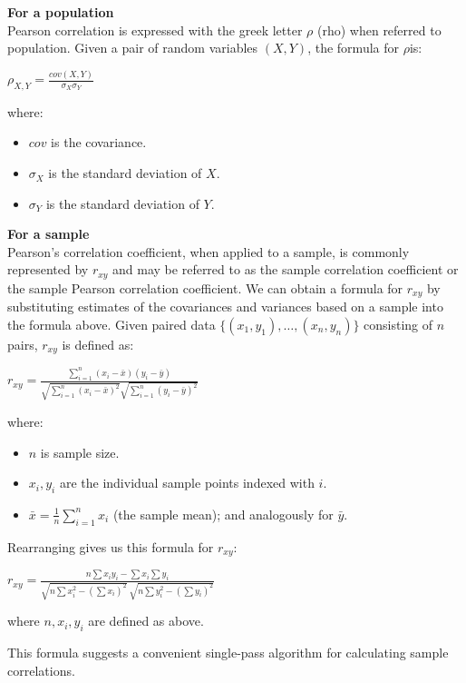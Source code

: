 \documentclass{article}
\begin{document}
\textbf{For a population}\\
Pearson correlation is expressed with the greek letter $\rho$ (rho) when referred to population.
Given a pair of random variables $(X,Y)$, the formula for $\rho$is:

$\displaystyle \rho _{X,Y}={\frac{cov(X,Y)}{\sigma _{X}\sigma _{Y}}}$

where:
\begin{itemize}
    \item $\displaystyle {cov}$ is the covariance.
    \item $\displaystyle \sigma _{X}$ is the standard deviation of $X$.
    \item $\displaystyle \sigma _{Y}$  is the standard deviation of $Y$.
\end{itemize}

\textbf{For a sample}\\
Pearson's correlation coefficient, when applied to a sample, is commonly represented by $r_{xy}$ and may be referred to as the sample correlation coefficient or the sample Pearson correlation coefficient. 
We can obtain a formula for $r_{xy}$ by substituting estimates of the covariances and variances based on a sample into the formula above. 
Given paired data $\displaystyle \{(x_{1},y_{1}),\ldots ,(x_{n},y_{n})\}$ consisting of $n$ pairs, $r_{xy}$ is defined as:

$\displaystyle r_{xy}={\frac {\sum _{i=1}^{n}(x_{i}-{\bar {x}})(y_{i}-{\bar {y}})}{{\sqrt {\sum _{i=1}^{n}(x_{i}-{\bar {x}})^{2}}}{\sqrt {\sum _{i=1}^{n}(y_{i}-{\bar {y}})^{2}}}}}$

where:
\begin{itemize}
    \item $n$ is sample size.
    \item $x_{i},y_{i}$ are the individual sample points indexed with $i$.
    \item ${\textstyle {\bar {x}}={\frac {1}{n}}\sum _{i=1}^{n}x_{i}}$ (the sample mean); and analogously for $\bar {y}$.
\end{itemize}

Rearranging gives us this formula for $\displaystyle r_{xy}$:

${\displaystyle r_{xy}={\frac {n\sum x_{i}y_{i}-\sum x_{i}\sum y_{i}}{{\sqrt {n\sum x_{i}^{2}-\left(\sum x_{i}\right)^{2}}}~{\sqrt {n\sum y_{i}^{2}-\left(\sum y_{i}\right)^{2}}}}}}$

where $n,x_{i},y_{i}$ are defined as above.

This formula suggests a convenient single-pass algorithm for calculating sample correlations.
\end{document}
